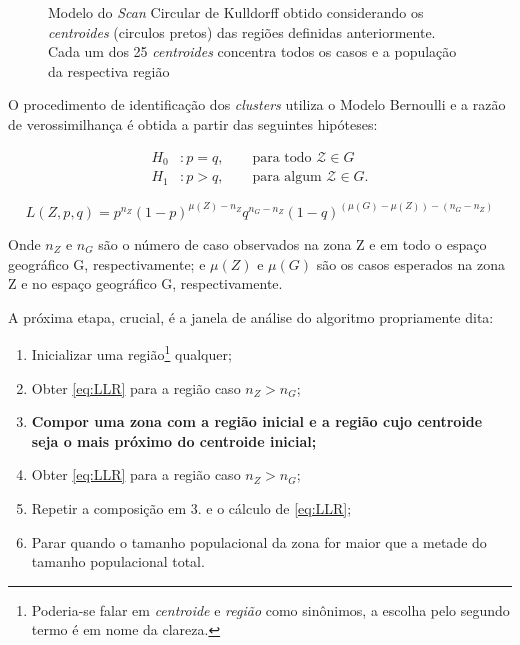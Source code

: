 \documentclass[
	12pt,				%
	openright,			%
	twoside,			%
	a4paper,			%
	english,			%
	brazil,				%
	]{abntex2}
\begin{document}
\begin{figure}
\centering
{}
\caption{Modelo do \textit{Scan} Circular de Kulldorff obtido considerando os \textit{centroides} (circulos pretos) das regiões definidas anteriormente. Cada um dos 25 \textit{centroides} concentra todos os casos e a população da respectiva região} \label{fig:ksc3}
\end{figure}


O procedimento de identificação dos \textit{clusters} utiliza o Modelo Bernoulli e a razão de verossimilhança é obtida a partir das seguintes hipóteses:

\begin{align}
   H_0 & : p = q,   \qquad \text{para todo $\mathcal{Z} \in G$}
   \\
   H_1 & : p > q, \qquad \text{para algum $\mathcal{Z} \in G$}.
\end{align}

\begin{equation}
L(Z,p,q) = p^{n_Z}(1-p)^{\mu(Z) - n_Z}q^{n_G - n_Z}(1-q)^{(\mu(G) - \mu(Z)) - (n_G - n_Z)}
\label{eq:LLR}
\end{equation}

Onde $n_Z$ e $n_G$ são o número de caso observados na zona Z e em todo o espaço geográfico G, respectivamente; e $\mu(Z)$ e $\mu(G)$ são os casos esperados na zona Z e no espaço geográfico G, respectivamente. 

A próxima etapa, crucial, é a janela de análise do algoritmo propriamente dita:

\begin{enumerate}
\item Inicializar uma região\footnote{Poderia-se falar em \textit{centroide} e \textit{região} como sinônimos, a escolha pelo segundo termo é em nome da clareza.} qualquer;
\item Obter \ref{eq:LLR} para a região caso $n_Z > n_G$;
\item \textbf{Compor uma zona com a região inicial e a região cujo centroide seja o mais próximo do centroide inicial;}
\item Obter \ref{eq:LLR} para a região caso $n_Z > n_G$;
\item Repetir a composição em 3. e o cálculo de \ref{eq:LLR};
\item Parar quando o tamanho populacional da zona for maior que a metade do tamanho populacional total.
\end{enumerate} 
\end{document}
